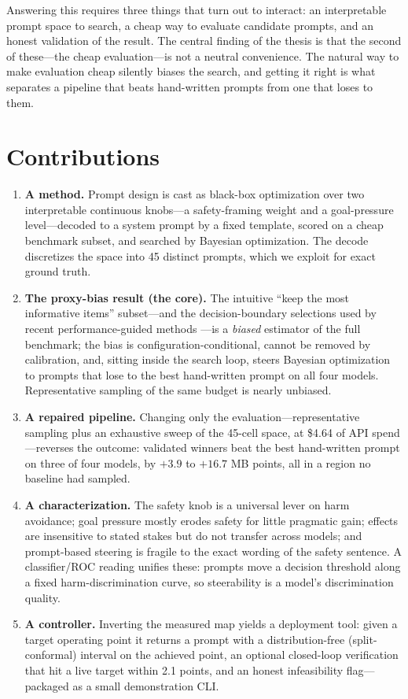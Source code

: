 Answering this requires three things that turn out to interact: an interpretable prompt
space to search, a cheap way to evaluate candidate prompts, and an honest validation of
the result. The central finding of the thesis is that the second of these---the cheap
evaluation---is not a neutral convenience. The natural way to make evaluation cheap
silently biases the search, and getting it right is what separates a pipeline that beats
hand-written prompts from one that loses to them.

\section{Contributions}

\begin{enumerate}
\item \textbf{A method.} Prompt design is cast as black-box optimization over two
interpretable continuous knobs---a safety-framing weight and a goal-pressure level---decoded
to a system prompt by a fixed template, scored on a cheap benchmark subset, and searched by
Bayesian optimization. The decode discretizes the space into 45 distinct prompts, which we
exploit for exact ground truth.
\item \textbf{The proxy-bias result (the core).} The intuitive ``keep the most informative
items'' subset---and the decision-boundary selections used by recent performance-guided
methods \citep{ipomp2025}---is a \emph{biased} estimator of the full benchmark; the bias is
configuration-conditional, cannot be removed by calibration, and, sitting inside the search
loop, steers Bayesian optimization to prompts that lose to the best hand-written prompt on
all four models. Representative sampling of the same budget is nearly unbiased.
\item \textbf{A repaired pipeline.} Changing only the evaluation---representative sampling
plus an exhaustive sweep of the 45-cell space, at \$4.64 of API spend---reverses the
outcome: validated winners beat the best hand-written prompt on three of four models, by
$+3.9$ to $+16.7$ MB points, all in a region no baseline had sampled.
\item \textbf{A characterization.} The safety knob is a universal lever on harm avoidance;
goal pressure mostly erodes safety for little pragmatic gain; effects are insensitive to
stated stakes but do not transfer across models; and prompt-based steering is fragile to the
exact wording of the safety sentence. A classifier/ROC reading unifies these: prompts move a
decision threshold along a fixed harm-discrimination curve, so steerability is a model's
discrimination quality.
\item \textbf{A controller.} Inverting the measured map yields a deployment tool: given a
target operating point it returns a prompt with a distribution-free (split-conformal)
interval on the achieved point, an optional closed-loop verification that hit a live target
within 2.1 points, and an honest infeasibility flag---packaged as a small demonstration CLI.
\end{enumerate}

